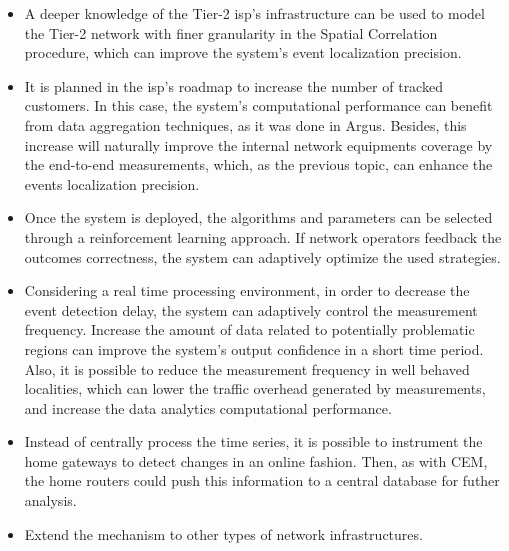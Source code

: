 \begin{itemize}
\item
A deeper knowledge of the Tier-2 \gls*{isp}'s infrastructure
can be used to model the Tier-2 network with finer granularity in the Spatial
Correlation procedure, which can improve the system's event localization
precision.

\item
It is planned in the \gls*{isp}'s roadmap to increase the number of tracked customers.
In this case, the system's computational performance can benefit from data
aggregation techniques, as it was done in Argus.
Besides, this increase will naturally improve the internal network equipments
coverage by the end-to-end measurements, which, as the previous topic, can
enhance the events localization precision.

\item
Once the system is deployed, the algorithms and parameters can be selected
through a reinforcement learning approach. If network operators
feedback the outcomes correctness, the system can adaptively optimize the used
strategies.

\item
Considering a real time processing environment, in order to decrease the
event detection delay, the system can adaptively control the measurement
frequency.
Increase the amount of data related to potentially problematic regions
can improve the system's output confidence in a short time period.
Also, it is possible to reduce the measurement frequency in well behaved
localities, which can lower the traffic overhead generated by measurements, and
increase the data analytics computational performance.

\item
Instead of centrally process the time series,
it is possible to instrument the home
gateways to detect changes in an online fashion. Then, as with CEM, the home
routers could push this information to a central database for futher analysis.

\item
Extend the mechanism to other types of network infrastructures.

\end{itemize}
